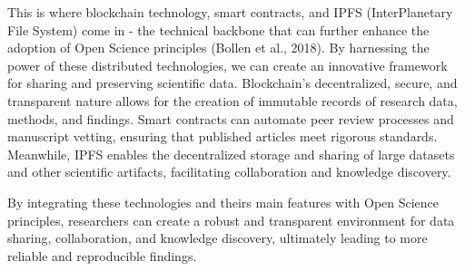 This is where blockchain technology, smart contracts, and IPFS (InterPlanetary File System) come in - the technical backbone that can further enhance the adoption of Open Science principles (Bollen et al., 2018). By harnessing the power of these distributed technologies, we can create an innovative framework for sharing and preserving scientific data. Blockchain's decentralized, secure, and transparent nature allows for the creation of immutable records of research data, methods, and findings. Smart contracts can automate peer review processes and manuscript vetting, ensuring that published articles meet rigorous standards. Meanwhile, IPFS enables the decentralized storage and sharing of large datasets and other scientific artifacts, facilitating collaboration and knowledge discovery.

By integrating these technologies and theirs main features with Open Science principles, researchers can create a robust and transparent environment for data sharing, collaboration, and knowledge discovery, ultimately leading to more reliable and reproducible findings.




